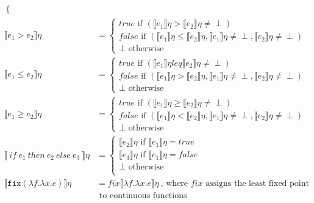 \documentclass{westhesis}
\begin{document}
\begin{align*}
\begin{cases}
   \end{cases}
 \\
  \llbracket e_1 > e_2 \rrbracket\eta &= 
 \begin{cases} 
      true \text{ if } (\llbracket e_1 \rrbracket\eta > \llbracket e_2 \rrbracket\eta \neq \perp) \\
      false \text{  if } (\llbracket e_1 \rrbracket\eta \leq \llbracket e_2\rrbracket\eta, \llbracket e_1 \rrbracket\eta \neq \perp, \llbracket e_2 \rrbracket\eta \neq \perp)\\
      \perp \text{ otherwise}
   \end{cases}
 \\
  \llbracket e_1 \leq e_2 \rrbracket\eta &= 
 \begin{cases} 
      true \text{ if } (\llbracket e_1 \rrbracket\eta leq \llbracket e_2 \rrbracket\eta \neq \perp) \\
      false \text{  if } (\llbracket e_1 \rrbracket\eta > \llbracket e_2\rrbracket\eta, \llbracket e_1 \rrbracket\eta \neq \perp, \llbracket e_2 \rrbracket\eta \neq \perp)\\
      \perp \text{ otherwise}
   \end{cases}
 \\
  \llbracket e_1 \geq e_2 \rrbracket\eta &= 
 \begin{cases} 
      true \text{ if } (\llbracket e_1 \rrbracket\eta \geq \llbracket e_2 \rrbracket\eta \neq \perp) \\
      false \text{  if } (\llbracket e_1 \rrbracket\eta < \llbracket e_2\rrbracket\eta, \llbracket e_1 \rrbracket\eta \neq \perp, \llbracket e_2 \rrbracket\eta \neq \perp)\\
      \perp \text{ otherwise}
   \end{cases}
 \\
  \llbracket \ if \ e_1 \ then \ e_2 \ else \ e_3 \ \rrbracket \eta &= 
 \begin{cases} 
      \llbracket e_2 \rrbracket\eta \text{ if } \llbracket e_1 \rrbracket\eta = true \\
      \llbracket e_3 \rrbracket\eta \text{ if } \llbracket e_1 \rrbracket\eta = false \\
      \perp \text{      otherwise} \\
   \end{cases}
  \\
   \llbracket  \texttt{fix} (\lambda f.\lambda x.e) \rrbracket\eta &= \underline{fix}\llbracket \lambda f.\lambda x.e \rrbracket\eta \
 \text{, where } \underline{fix} \text{ assigns the least fixed point} \\ 
 &\text{ \ \ \ \ \ \ \ \ \ \ \ \ \ \ \ \ \ \ \ \ \ \ \ to continuous functions} \\
 \end{align*}
\end{document}
